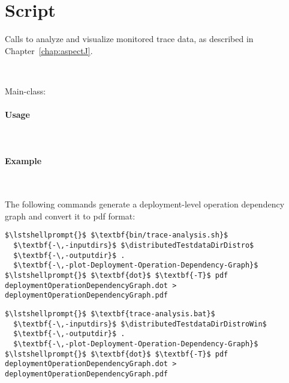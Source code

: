 \section{Script }\label{appendix:wrapperScripts:traceAnalysis}

Calls \KickerTraceAnalysis{} to analyze and visualize monitored trace data, %
as described in Chapter~\ref{chap:aspectJ}.

\

\noindent Main-class: {\small {}}


\paragraph*{Usage}\

\enlargethispage{1cm}

\setTextListing


\paragraph*{Example}\

\noindent The following commands generate a deployment-level operation dependency 
graph and convert it to pdf format:

\enlargethispage{1cm}

\setTextListing
\begin{lstlisting}[caption=Execution under UNIX-like systems]
$\lstshellprompt{}$ $\textbf{bin/trace-analysis.sh}$
  $\textbf{-\,-inputdirs}$ $\distributedTestdataDirDistro$ 
  $\textbf{-\,-outputdir}$ . 
  $\textbf{-\,-plot-Deployment-Operation-Dependency-Graph}$
$\lstshellprompt{}$ $\textbf{dot}$ $\textbf{-T}$ pdf  deploymentOperationDependencyGraph.dot > deploymentOperationDependencyGraph.pdf
\end{lstlisting}

\begin{lstlisting}[caption=Execution under Windows]
$\lstshellprompt{}$ $\textbf{trace-analysis.bat}$
  $\textbf{-\,-inputdirs}$ $\distributedTestdataDirDistroWin$ 
  $\textbf{-\,-outputdir}$ . 
  $\textbf{-\,-plot-Deployment-Operation-Dependency-Graph}$
$\lstshellprompt{}$ $\textbf{dot}$ $\textbf{-T}$ pdf  deploymentOperationDependencyGraph.dot > deploymentOperationDependencyGraph.pdf
\end{lstlisting}

